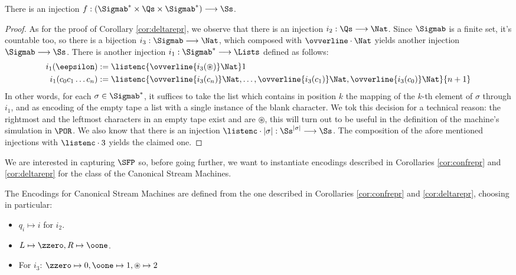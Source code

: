 \begin{conditional}{\notappendix}
  \begin{cor}
    \label{cor:confrepr}
    There is an injection $f: (\Sigmab^* \times \Qs \times \Sigmab^*)
    \longrightarrow  \Ss$.
  \end{cor}
  \begin{proof}
    As for the proof of Corollary \ref{cor:deltarepr}, we observe that there is
    an injection $i_2: \Qs \longrightarrow \Nat$.
    Since $\Sigmab$ is a finite set, it's countable too, so there is a bijection
    $i_3: \Sigmab \longrightarrow \Nat$, which composed with $\ovverline \cdot \Nat$
    yields another injection $\Sigmab \longrightarrow \Ss$. There is another
    injection $i_1: \Sigmab^* \longrightarrow \Lists$ defined as follows:
    \begin{align*}
    i_1(\eepsilon)&:=\listenc {\ovverline {i_3(\circledast)}\Nat} 1\\
    i_1(c_0c_1\ldots c_n)&:=\listenc {\ovverline {i_3(c_n)}\Nat,\ldots,
    \ovverline {i_3(c_1)}\Nat, \ovverline {i_3(c_0)}\Nat} {n+1}
    \end{align*}
    In other words,
    for each $\sigma\in \Sigmab^*$, it suffices to take the list which contains
    in position $k$ the mapping of the $k$-th element of $\sigma$ through
    $i_1$, and as encoding of the empty tape a list with a single instance of
    the blank character. We tok this decision for a technical reason:
    the rightmost and the leftmost characters in an empty tape exist and are
    $\circledast$, this will turn out to be useful in the definition of
    the machine's simulation in $\POR$. We also know that there is an injection
    $\listenc \cdot {|\sigma|}: \Ss^{|\sigma|}\longrightarrow \Ss$.
    The composition of the afore mentioned injections with
    $\listenc \cdot 3$ yields the claimed one.
  \end{proof}

  We are interested in capturing $\SFP$ so, before going further,
  we want to instantiate encodings described in
  Corollaries \ref{cor:confrepr} and \ref{cor:deltarepr} for the class of the
  Canonical Stream Machines.

  \begin{defn}
    \label{def:canencs}
    The Encodings for Canonical Stream Machines are defined from
    the one described in Corollaries \ref{cor:confrepr} and \ref{cor:deltarepr},
    choosing in particular:
    \begin{itemize}
      \item $q_i \mapsto i$ for $i_2$.
      \item $L\mapsto \zzero, R\mapsto \oone$.
      \item For $i_3$: $\zzero \mapsto 0, \oone \mapsto 1, \circledast \mapsto 2$
    \end{itemize}
  \end{defn}



\end{conditional}
